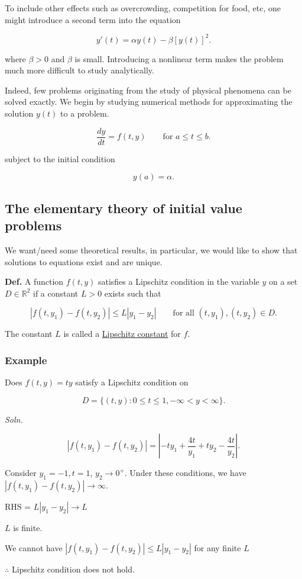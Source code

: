 \documentclass[12pt]{article}
\newcommand{\defn}{\textbf{Def.}\xspace}
\newcommand{\soln}{\textit{Soln.}\xspace}
\begin{document}
To include other effects such as overcrowding, competition for food, etc, one
might introduce a second term into the equation

\begin{equation*}
  y'(t) = \alpha y(t) - \beta [y(t)]^2
.\end{equation*}

where $\beta > 0$ and $\beta$ is small. Introducing a nonlinear term makes the
problem much more difficult to study analytically.

Indeed, few problems originating from the study of physical phenomena can be
solved exactly. We begin by studying numerical methods for approximating the
solution $y(t)$ to a problem.

\[
  \frac{dy}{dt} = f(t, y) \qquad \text{for } a \leq t \leq b
.\]

subject to the initial condition 

\[
y(a) = \alpha
.\]

\subsection{The elementary theory of initial value problems}

We want/need some theoretical results, in particular, we would like to show that
solutions to equations exist and are unique.

\defn A function $f(t,y)$ satisfies a Lipschitz condition in the variable $y$ on
a set $D \in \mathbb{R}^2$ if a constant $L > 0$ exists such that

\[
  |f(t,y_1) - f(t, y_2)| \leq L|y_1 - y_2| \qquad \text{for all } (t,y_1), (t,y_2) \in D
.\]

The constant $L$ is called a \uline{Lipschitz constant} for $f$.

\pagebreak
\subsubsection{Example}

Does $f(t,y) = ty$ satisfy a Lipschitz condition on 

\[
D  = \{(t,y) : 0 \leq t \leq 1, -\infty < y < \infty\}
.\]

\soln


\begin{equation*}
|f(t,y_1) - f(t, y_2)| = |-ty_1 + \frac{4t}{y_1} + ty_2 - \frac{4t}{y_2}|
.\end{equation*}


Consider $y_1 = -1, t=1$, $y_2 \to 0^+$. Under these conditions, we have
$|f(t,y_1) - f(t,y_2)| \to \infty$.

RHS = $L|y_1-y_2| \to L$

$L$ is finite.

We cannot have $|f(t,y_1) - f(t,y_2)| \leq L|y_1 - y_2|$ for any finite $L$

$\therefore$ Lipschitz condition does not hold.
\end{document}
